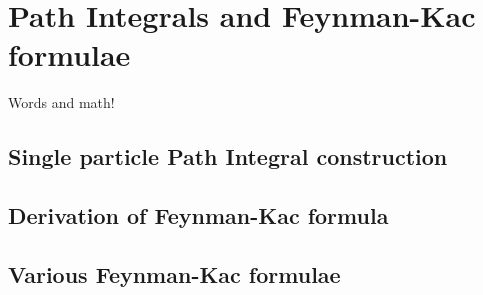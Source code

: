 \chapter{Path Integrals and Feynman-Kac formulae}
Words and math!
\section{ Single particle Path Integral construction}
\section{Derivation of Feynman-Kac formula }
\section{ Various Feynman-Kac formulae}

